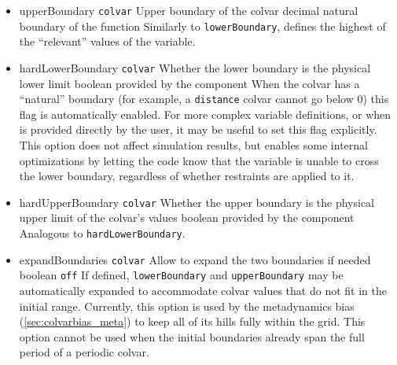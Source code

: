 \begin{itemize}
\item %
  \keydef
    {upperBoundary}{%
    \texttt{colvar}}{%
    Upper boundary of the colvar}{%
    decimal}{%
    natural boundary of the function}{%
    Similarly to \texttt{lowerBoundary}, defines the highest of the ``relevant'' values of the variable.}

\item %
  \keydef
    {hardLowerBoundary}{%
    \texttt{colvar}}{%
    Whether the lower boundary is the physical lower limit}{%
    boolean}{%
    provided by the component}{%
    When the colvar has a ``natural'' boundary (for example, a \texttt{distance} colvar cannot go below 0) this flag is automatically enabled.
    For more complex variable definitions, or when  is provided directly by the user, it may be useful to set this flag explicitly.
    This option does not affect simulation results, but enables some internal optimizations by letting the code know that the variable is unable to cross the lower boundary, regardless of whether restraints are applied to it.
}

\item %
  \keydef
    {hardUpperBoundary}{%
    \texttt{colvar}}{%
    Whether the upper boundary is the physical upper limit of the colvar's values}{%
    boolean}{%
    provided by the component}{%
    Analogous to \texttt{hardLowerBoundary}.}

\item %
  \keydef
    {expandBoundaries}{%
    \texttt{colvar}}{%
    Allow to expand the two boundaries if needed}{%
    boolean}{%
    \texttt{off}}{%
    If defined, \texttt{lowerBoundary} and \texttt{upperBoundary} may be automatically expanded to accommodate colvar values that do not fit in the initial range.
    Currently, this option is used by the metadynamics bias
    (\ref{sec:colvarbias_meta}) to keep all of its hills fully within
    the grid.  This option cannot be used when
      the initial boundaries already span the full period of a periodic
      colvar.}

\end{itemize}



